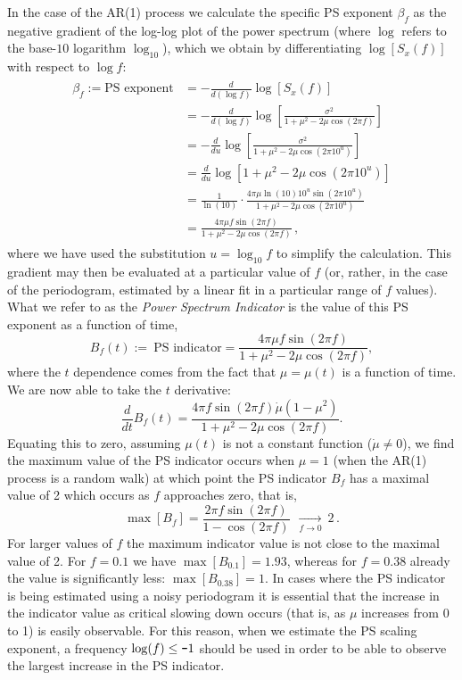 {{In the case of the AR(1) process we calculate the specific PS exponent $\beta_f$ as the negative gradient of the log-log plot of the power spectrum (where $\log$ refers to the base-$10$ logarithm $\log_{10}$), which we obtain by differentiating $\log[S_x(f)]$ with respect to $\log f$:
	\begin{align}
		\begin{split}
		\beta_f := \text{PS exponent} &= -\frac{d}{d(\log f)}\log[S_x(f)]\\
		&= -\frac{d}{d(\log f)}\log\left[\frac{\sigma^2}{1+ \mu^2 - 2\mu\cos(2\pi f)}\right]\\
		&= -\frac{d}{du} \log\left[\frac{\sigma^2}{1+\mu^2-2\mu\cos(2\pi 10^u)}\right]\\
		&= \frac{d}{du} \log\left[1+\mu^2-2\mu\cos(2\pi 10^u)\right]\\
		&= \frac{1}{\ln(10)}\cdot\frac{4\pi \mu \ln(10) 10^u \sin(2\pi 10^u)}{1+\mu^2-2\mu\cos(2\pi 10^u)}\\
		&= \frac{4\pi \mu f \sin(2\pi f)}{1+\mu^2-2\mu\cos(2\pi f)}\,,
		\end{split}
	\end{align}
where we have used the substitution $u = \log_{10}f$ to simplify the calculation. This gradient may then be evaluated at a particular value of $f$ (or, rather, in the case of the periodogram, estimated by a linear fit in a particular range of $f$ values). What we refer to as the \emph{Power Spectrum Indicator} is the value of this PS exponent as a function of time,
	\begin{equation}
	\label{eqn:1D:AR1_psindicator}
		B_f(t):=~\text{PS indicator} = \frac{4\pi \mu f \sin(2\pi f)}{1+\mu^2-2\mu\cos(2\pi f)},
	\end{equation}
where the $t$ dependence comes from the fact that $\mu = \mu(t)$ is a function of time. We are now able to take the $t$ derivative:
	\begin{equation}
		\frac{d}{dt}B_f(t) = \frac{4\pi f \sin(2\pi f)\dot\mu(1-\mu^2)}{1+\mu^2-2\mu\cos(2\pi f)}.
	\end{equation}
Equating this to zero, assuming $\mu(t)$ is not a constant function ($\dot\mu \neq 0$), we find the maximum value of the PS indicator occurs when $\mu=1$ (when the AR(1) process is a random walk) at which point the PS indicator $B_f$ has a maximal value of 2 which occurs as $f$ approaches zero, that is,
	\begin{equation}
	\label{eqn:1D:maximumPSindicator_AR1}
		\max[B_f] = \frac{2\pi f \sin(2\pi f)}{1-\cos(2\pi f)} ~~\xrightarrow[f\rightarrow 0]{}~ 2\,.
	\end{equation}
For larger values of $f$ the maximum indicator value is not close to the maximal value of 2. For $f = 0.1$ we have $\max[B_{0.1}] = 1.93$, whereas for $f = 0.38$ already the value is significantly less:  $\max[B_{0.38}] = 1$. In cases where the PS indicator is being estimated using a noisy periodogram it is essential that the increase in the indicator value as critical slowing down occurs (that is, as $\mu$ increases from 0 to 1) is easily observable. For this reason, when we estimate the PS scaling exponent, a frequency $\log(f)\leq \textup{\texttt{-}}1$ should be used in order to be able to observe the largest increase in the PS indicator.
}

}
